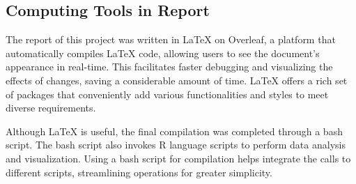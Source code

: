 \documentclass[11pt]{article}
\begin{document}
\subsection{Computing Tools in Report}

The report of this project was written in LaTeX on Overleaf, a platform that automatically compiles LaTeX code, allowing users to see the document's appearance in real-time. This facilitates faster debugging and visualizing the effects of changes, saving a considerable amount of time. LaTeX offers a rich set of packages that conveniently add various functionalities and styles to meet diverse requirements.\par
Although LaTeX is useful, the final compilation was completed through a bash script. The bash script also invokes R language scripts to perform data analysis and visualization. Using a bash script for compilation helps integrate the calls to different scripts, streamlining operations for greater simplicity.
\end{document}
